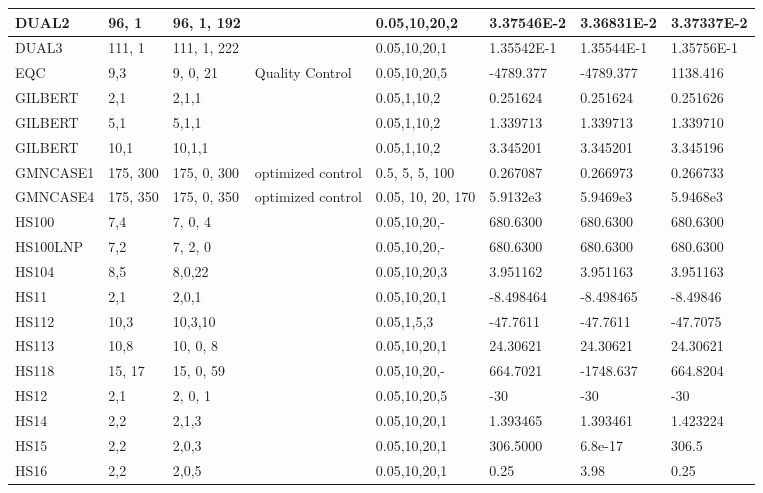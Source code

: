 \begin{landscape}
\begin{longtable}{l | l |  l  |  >{\footnotesize}p{3cm} | l | l | l | l  }
DUAL2 & 96, 1 & 96, 1, 192 &    &  0.05,10,20,2 &  3.37546E-2 & 3.36831E-2 &    3.37337E-2 \\ \hline
DUAL3 & 111, 1 &  111, 1, 222 &  & 0.05,10,20,1 &1.35542E-1  &    1.35544E-1  &   1.35756E-1\\ \hline
EQC & 9,3  & 9, 0, 21 & Quality Control & 0.05,10,20,5 & -4789.377 & -4789.377 & 1138.416 \\ \hline
GILBERT & 2,1 & 2,1,1 &  & 0.05,1,10,2  & 0.251624        &  0.251624     &  0.251626 \\ \hline
GILBERT & 5,1 & 5,1,1 &  & 0.05,1,10,2  & 1.339713        &  1.339713    &  1.339710 \\ \hline
GILBERT & 10,1 & 10,1,1 &  & 0.05,1,10,2  & 3.345201       &  3.345201    &  3.345196 \\ \hline
GMNCASE1 &  175, 300   & 175, 0, 300  &   optimized control   & 0.5, 5, 5, 100   &   0.267087  & 0.266973             &    0.266733   \\ \hline
GMNCASE4 & 175, 350 & 175, 0, 350  &  optimized control &  0.05, 10, 20, 170      & 5.9132e3 &  5.9469e3 &   5.9468e3 \\ \hline 
HS100  & 7,4 & 7, 0, 4 & &0.05,10,20,- &  680.6300 & 680.6300 & 680.6300  \\ \hline
HS100LNP & 7,2 & 7, 2, 0 & & 0.05,10,20,-  &  680.6300 & 680.6300 & 680.6300 \\ \hline
HS104 &  8,5 & 8,0,22 & &  0.05,10,20,3 & 3.951162  &     3.951163 &  3.951163    \\ \hline
HS11  & 2,1 & 2,0,1 & & 0.05,10,20,1     & -8.498464 &     -8.498465 & -8.49846   \\ \hline
HS112 & 10,3 & 10,3,10 & & 0.05,1,5,3 & -47.7611 &  -47.7611 & -47.7075   \\ \hline
HS113 & 10,8 & 10, 0, 8 & & 0.05,10,20,1 & 24.30621 & 24.30621 & 24.30621   \\ \hline
HS118 & 15, 17 & 15, 0, 59 & &  0.05,10,20,- & 664.7021 & -1748.637  & 664.8204  \\ \hline
HS12 & 2,1 & 2, 0, 1 & &   0.05,10,20,5 & -30 & -30 & -30   \\ \hline
HS14 & 2,2 & 2,1,3 & &   0.05,10,20,1  &   1.393465 &  1.393461               & 1.423224\\ \hline
HS15 & 2,2 & 2,0,3 & &   0.05,10,20,1 &    306.5000 & 6.8e-17 & 306.5 \\ \hline
HS16 & 2,2 & 2,0,5 & &   0.05,10,20,1    & 0.25 & 3.98 &    0.25 \\ \hline

\end{longtable}
\end{landscape}
